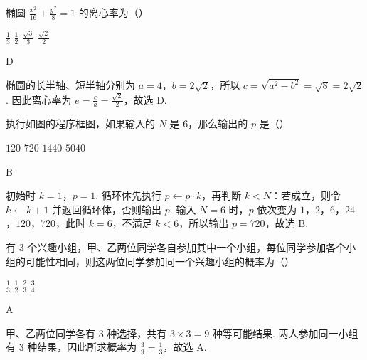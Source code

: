 \begin{problem}
椭圆 \(\frac{x^2}{16} + \frac{y^2}{8} = 1\) 的离心率为（\quad）

\choices
    {\( \frac{1}{3} \)}
    {\( \frac{1}{2} \)}
    {\( \frac{\sqrt{3}}{3} \)}
    {\(\frac{\sqrt{2}}{2}\)}

\end{problem}

\begin{answer}
D
\end{answer}

\begin{solution}
椭圆的长半轴、短半轴分别为 \(a=4\)，\(b=2\sqrt{2}\)，所以 \(c=\sqrt{a^2-b^2}=\sqrt{8}=2\sqrt{2}\). 因此离心率为 \(e=\frac{c}{a}=\frac{\sqrt{2}}{2}\)，故选 D.
\end{solution}

\begin{problem}
执行如图的程序框图，如果输入的 \(N\) 是 6，那么输出的 \(p\) 是（\quad）


\choices
    {\(120\)}
    {\(720\)}
    {\(1440\)}
    {\(5040\)}

\end{problem}

\begin{answer}
B
\end{answer}

\begin{solution}
初始时 \(k=1\)，\(p=1\). 循环体先执行 \(p\leftarrow p\cdot k\)，再判断 \(k<N\)：若成立，则令 \(k\leftarrow k+1\) 并返回循环体，否则输出 \(p\). 输入 \(N=6\) 时，\(p\) 依次变为 \(1\)，\(2\)，\(6\)，\(24\)，\(120\)，\(720\)，此时 \(k=6\)，不满足 \(k<6\)，所以输出 \(p=720\)，故选 B.
\end{solution}

\begin{problem}
有 \(3\) 个兴趣小组，甲、乙两位同学各自参加其中一个小组，每位同学参加各个小组的可能性相同，则这两位同学参加同一个兴趣小组的概率为（\quad）

\choices
    {\( \frac{1}{3} \)}
    {\( \frac{1}{2} \)}
    {\( \frac{2}{3} \)}
    {\( \frac{3}{4} \)}

\end{problem}

\begin{answer}
A
\end{answer}

\begin{solution}
甲、乙两位同学各有 \(3\) 种选择，共有 \(3\times3=9\) 种等可能结果. 两人参加同一小组有 \(3\) 种结果，因此所求概率为 \(\frac{3}{9}=\frac{1}{3}\)，故选 A.
\end{solution}

